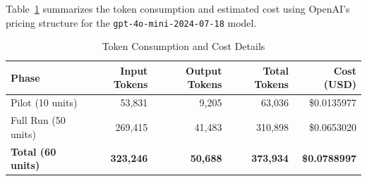 Table~\ref{tab:token_cost} summarizes the token consumption and estimated cost using OpenAI's pricing structure for the \texttt{gpt-4o-mini-2024-07-18} model.

\begin{table}[htbp]
\caption{Token Consumption and Cost Details}
\label{tab:token_cost}
\centering
\begin{tabular}{lrrrr}
\toprule
\textbf{Phase} & \textbf{Input Tokens} & \textbf{Output Tokens} & \textbf{Total Tokens} & \textbf{Cost (USD)} \\
\midrule
Pilot (10 units) & 53,831 & 9,205 & 63,036 & \$0.0135977 \\
Full Run (50 units) & 269,415 & 41,483 & 310,898 & \$0.0653020 \\
\midrule
\textbf{Total (60 units)} & \textbf{323,246} & \textbf{50,688} & \textbf{373,934} & \textbf{\$0.0788997} \\
\bottomrule
\end{tabular}
\end{table}
